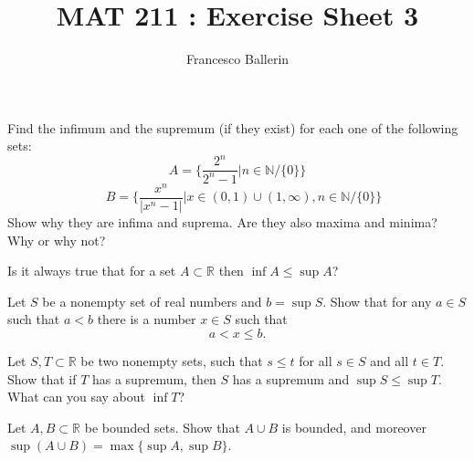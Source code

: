 \documentclass[11pt]{article}%
\title{MAT 211 : Exercise Sheet 3}
\author{Francesco Ballerin}
\date{\color{gray}{\small{francesco.ballerin@uib.no}}}
\newcommand{\R}{\mathbb{R}}
\begin{document}
\begin{minipage}[t]{\dimexpr \textwidth-6cm-\columnsep}
     \maketitle
\end{minipage}
\hfill\noindent{}

\vspace{50pt}

\begin{Exercise}[title=**$\dagger$]
	Find the infimum and the supremum (if they exist) for each one of the following sets:
	$$
	A=\bigg\{ \frac{2^n}{2^n-1} \Big|  n\in\mathbb N/\{0\} \bigg\}$$
	$$\quad B=\bigg\{ \frac{x^n}{|x^n-1|}\Big| x\in(0,1)\cup(1,\infty), n\in\mathbb N/\{0\} \bigg\}
	$$
	Show why they are infima and suprema.
	Are they also maxima and minima? Why or why not?
\end{Exercise}

\begin{Exercise}[title=*]
	Is it always true that for a set $A\subset \R$ then $\inf A \leq \sup A$?
\end{Exercise}

\begin{Exercise}[title=**]
	Let $S$ be a nonempty set of real numbers and $b=\sup S$. Show that for any $a\in S$ such that $a<b$ there is a number $x\in S$ such that $$a<x\leq b.$$
\end{Exercise}


\begin{Exercise}[title=**]
	Let $S,T\subset{\mathbb R}$ be two nonempty sets, such that $s\leq t$ for all $s\in S$ and all $t\in T$. Show that if $T$ has a supremum, then $S$ has a supremum and $\sup S\leq\sup T$. What can you say about $\inf T$?
\end{Exercise}

\begin{Exercise} [title=**]
	Let $A,B\subset{\mathbb R}$ be bounded sets. Show that $A\cup B$ is bounded, and moreover $\sup(A\cup B)=\max\{\sup A,\sup B\}$.
\end{Exercise}
\end{document}
